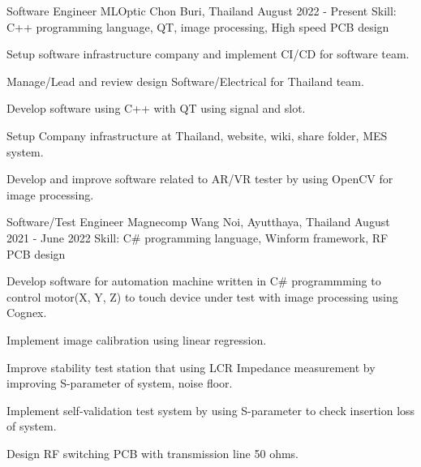 
\begin{cventries}

  \cventry
    {Software Engineer} %
    {MLOptic} %
    {Chon Buri, Thailand} %
    {August 2022 - Present} %
    {Skill: C++ programming language, QT, image processing, High speed PCB design} %
    {
      \begin{cvitems} %
      \item {Setup software infrastructure company and implement CI/CD for software team.}
      \item {Manage/Lead and review design Software/Electrical for Thailand team.}
      \item {Develop software using C++ with QT using signal and slot.}
      \item {Setup Company infrastructure at Thailand, website, wiki, share folder, MES system.}
      \item {Develop and improve software related to AR/VR tester by using OpenCV for image processing.}
      \end{cvitems}
    }

  \cventry
    {Software/Test Engineer} %
    {Magnecomp} %
    {Wang Noi, Ayutthaya, Thailand} %
    {August 2021 - June 2022} %
    {Skill: C\# programming language, Winform framework, RF PCB design} %
    {
      \begin{cvitems} %
      \item {Develop software for automation machine written in C\# programmming
        to control motor(X, Y, Z) to touch device under test with image processing using Cognex.}
      \item {Implement image calibration using linear regression.}
      \item {Improve stability test station that using LCR Impedance measurement
        by improving S-parameter of system, noise floor.}
      \item {Implement self-validation test system by using S-parameter to
        check insertion loss of system.}
      \item {Design RF switching PCB with transmission line 50 ohms.}
      \end{cvitems}
    }


\end{cventries}
